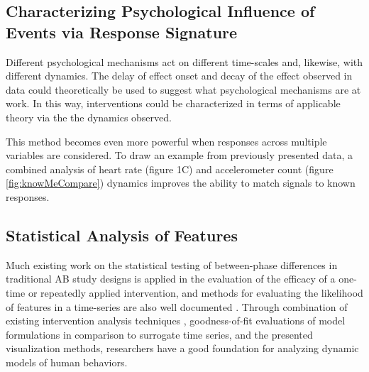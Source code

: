 \subsection{Characterizing Psychological Influence of Events via Response Signature}
Different psychological mechanisms act on different time-scales and, likewise, with different dynamics.
The delay of effect onset and decay of the effect observed in data could theoretically be used to suggest what psychological mechanisms are at work.
In this way, interventions could be characterized in terms of applicable theory via the the dynamics observed.

This method becomes even more powerful when responses across multiple variables are considered.
To draw an example from previously presented data, a combined analysis of heart rate (figure 1C) and accelerometer count (figure \ref{fig:knowMeCompare}) dynamics improves the ability to match signals to known responses.

\subsection{Statistical Analysis of Features}
Much existing work on the statistical testing of between-phase differences in traditional AB study designs \cite{parker2003} is applied in the evaluation of the efficacy of a one-time or repeatedly applied intervention, and methods for evaluating the likelihood of features in a time-series are also well documented \cite{gorman1996, suen1989}.
Through combination of existing intervention analysis techniques \cite{box1975}, goodness-of-fit evaluations of model formulations \cite{pankratz2012} in comparison to surrogate time series, and the presented visualization methods, researchers have a good foundation for analyzing dynamic models of human behaviors. %
